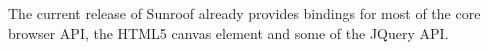 The current release of Sunroof already provides bindings for most of the 
core browser API, the HTML5 canvas element and some of the JQuery API.

\begin{comment}
Table \ref{tab:ffi} gives an overview of
how Sunroof's FFI can be used. 
\begin{table}
\begin{center}
\begin{tabular}{l@{\quad}p{7cm}}
  \hline\rule{0pt}{12pt}%
  JavaScript & 
  Sunroof \\ \hline\rule{0pt}{12pt}%
%
  \Src{alert("Test");} & 
  \Src{fun "alert" \$\$ "Test"} \\[2pt]
%
  \Src{alert} as a Sunroof function & 
  \Src{alert :: JSFunction JSString ()\newline alert = fun "alert"} \\[2pt]
%
  \Src{alert} as a Haskell function & 
  \Src{alert :: JSString -> JS t ()\newline alert s = fun "alert" \$\$ s} \\[2pt]
%
  \Src{document.getElementById("id");} & 
  \Src{object "document" \# invoke "getElementById" "id"} \\[2pt]
%
  \Src{getElementById} as method & 
  \Src{getElementById :: JSString -> JSObject -> JS t JSObject\newline
       getElementById s = invoke "getElementById" s} \\[2pt]
\hline
\end{tabular}
\end{center}
\caption{JavaScript expressed through the Sunroof FFI.}
\label{tab:ffi}
\end{table} 
\end{comment}